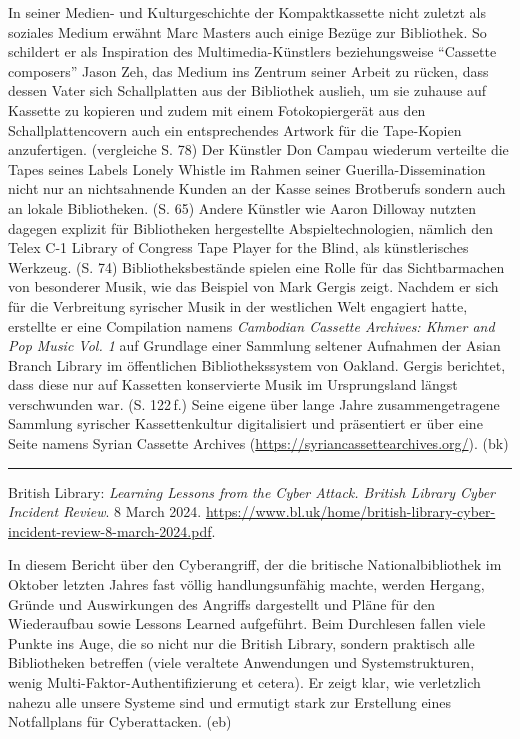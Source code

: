\documentclass[a4paper,
fontsize=11pt,
oneside,
numbers=noperiodatend,
parskip=half-,
bibliography=totoc,
final
]{scrartcl}
\begin{document}
In seiner Medien- und Kulturgeschichte der Kompaktkassette nicht zuletzt
als soziales Medium erwähnt Marc Masters auch einige Bezüge zur
Bibliothek. So schildert er als Inspiration des Multimedia-Künstlers
beziehungsweise \enquote{Cassette composers} Jason Zeh, das Medium ins
Zentrum seiner Arbeit zu rücken, dass dessen Vater sich Schallplatten
aus der Bibliothek auslieh, um sie zuhause auf Kassette zu kopieren und
zudem mit einem Fotokopiergerät aus den Schallplattencovern auch ein
entsprechendes Artwork für die Tape-Kopien anzufertigen. (vergleiche S.
78) Der Künstler Don Campau wiederum verteilte die Tapes seines Labels
Lonely Whistle im Rahmen seiner Guerilla-Dissemination nicht nur an
nichtsahnende Kunden an der Kasse seines Brotberufs sondern auch an
lokale Bibliotheken. (S. 65) Andere Künstler wie Aaron Dilloway nutzten
dagegen explizit für Bibliotheken hergestellte Abspieltechnologien,
nämlich den Telex C-1 Library of Congress Tape Player for the Blind, als
künstlerisches Werkzeug. (S. 74) Bibliotheksbestände spielen eine Rolle
für das Sichtbarmachen von besonderer Musik, wie das Beispiel von Mark
Gergis zeigt. Nachdem er sich für die Verbreitung syrischer Musik in der
westlichen Welt engagiert hatte, erstellte er eine Compilation namens
\emph{Cambodian Cassette Archives: Khmer and Pop Music Vol. 1} auf
Grundlage einer Sammlung seltener Aufnahmen der Asian Branch Library im
öffentlichen Bibliothekssystem von Oakland. Gergis berichtet, dass diese
nur auf Kassetten konservierte Musik im Ursprungsland längst
verschwunden war. (S. 122\,f.) Seine eigene über lange Jahre
zusammengetragene Sammlung syrischer Kassettenkultur digitalisiert und
präsentiert er über eine Seite namens Syrian Cassette Archives
(\url{https://syriancassettearchives.org/}). (bk)

\begin{center}\rule{0.5\linewidth}{0.5pt}\end{center}

British Library: \emph{Learning Lessons from the Cyber Attack. British
Library Cyber Incident Review}. 8 March 2024.
\url{https://www.bl.uk/home/british-library-cyber-incident-review-8-march-2024.pdf}.

In diesem Bericht über den Cyberangriff, der die britische
Nationalbibliothek im Oktober letzten Jahres fast völlig
handlungsunfähig machte, werden Hergang, Gründe und Auswirkungen des
Angriffs dargestellt und Pläne für den Wiederaufbau sowie Lessons
Learned aufgeführt. Beim Durchlesen fallen viele Punkte ins Auge, die so
nicht nur die British Library, sondern praktisch alle Bibliotheken
betreffen (viele veraltete Anwendungen und Systemstrukturen, wenig
Multi-Faktor-Authentifizierung et cetera). Er zeigt klar, wie
verletzlich nahezu alle unsere Systeme sind und ermutigt stark zur
Erstellung eines Notfallplans für Cyberattacken. (eb)
\end{document}
